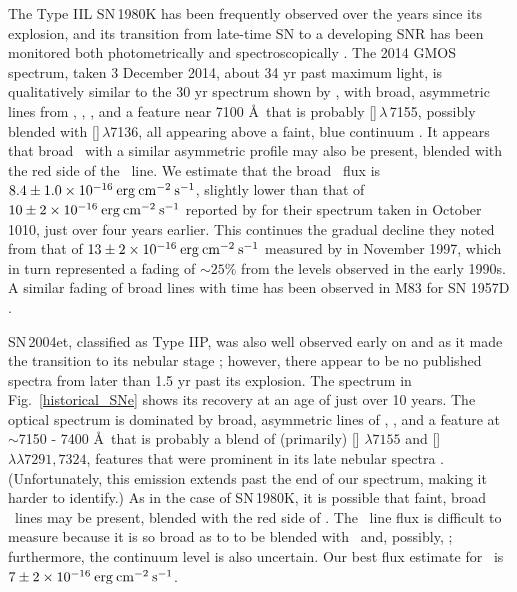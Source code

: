 The Type IIL SN\,1980K has been frequently observed over the years since its explosion, and its transition from late-time SN to a developing SNR has been monitored both photometrically and spectroscopically \citep[e.g.,][]{uomoto86, fesen90, fesen94, fesen99b, milisavljevic12}.  The 2014 GMOS spectrum, taken 3 December 2014, about  34 yr past maximum light, is qualitatively similar to the 30 yr spectrum shown by \citet{milisavljevic12}, with broad, asymmetric lines from \ha, \oi, \oiii, and a feature near 7100 \AA\ that is probably []\,$\lambda$\,7155, possibly blended with []\,$\lambda$7136, all appearing above a faint, blue continuum \citep[see][for a discussion of the 7100 \AA\ feature]{fesen94}.  It appears that broad \SiiL\ with a similar asymmetric profile may also be present, blended with the red side of the  \ha\ line.  We estimate that the broad \ha\ flux is $8.4 \pm 1.0 \times 10^{-16} \:{\rm erg\:cm^{-2}\:s^{-1}}$, slightly lower than that of $10 \pm 2 \times 10^{-16} \:{\rm erg\:cm^{-2}\:s^{-1}}$ reported by \citet{milisavljevic12} for their spectrum taken in October 1010, just over four years earlier.  This continues the gradual decline they noted from that of $13 \pm 2 \times 10^{-16} \:{\rm erg\:cm^{-2}\:s^{-1}}$ measured by \citet{fesen99b} in November 1997, which in turn represented a fading of $\sim 25\%$ from the levels observed in the early 1990s. A similar fading of broad lines with time has been observed in M83 for SN 1957D \citep{long12}.

SN\,2004et, classified as Type IIP, was also well observed early on and as it made the transition to its nebular stage \citep[e.g.,][]{sahu06, maguire10, jerkstrand12}; however, there appear to be no published spectra from later than 1.5 yr past its explosion.  The spectrum in Fig.~\ref{historical_SNe} shows its recovery at an age of just over 10 years.  The optical spectrum is dominated by broad, asymmetric lines of \ha, \oi, and a feature at $\sim$7150 - 7400 \AA\ that is probably a blend of (primarily)  [] $\lambda 7155$ and [] $\lambda\lambda 7291, 7324$, features that were prominent in its late nebular spectra \citep{sahu06, maguire10}.  (Unfortunately, this emission extends past the end of our spectrum, making it harder to identify.)  As in the case of SN\,1980K, it is possible that faint, broad \SiiL\ lines may be present, blended with the red side of \ha.  The \ha\ line flux is difficult to measure because it is so broad as to to be blended with \oi\ and, possibly, \sii; furthermore, the continuum level is also uncertain.  Our best flux estimate for \ha\ is $7 \pm 2 \times 10^{-16} \:{\rm erg\:cm^{-2}\:s^{-1}}$.

